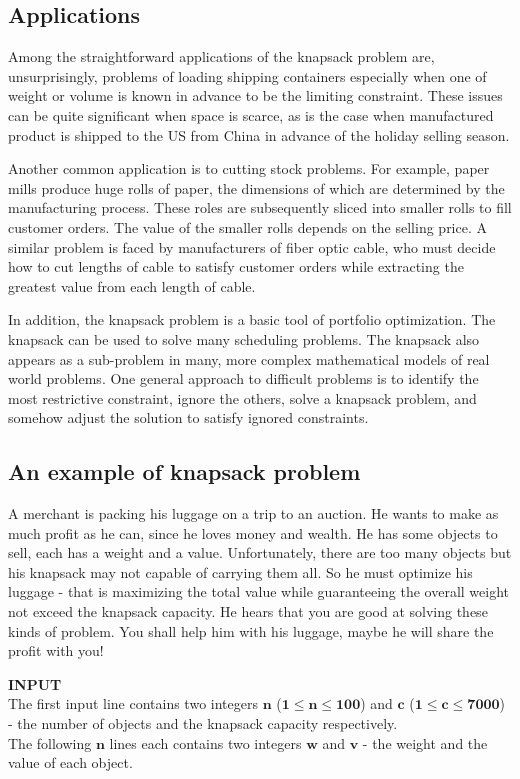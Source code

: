 \documentclass{article}
\begin{document}
\subsection{Applications}
\indent Among the straightforward applications of the knapsack problem are, unsurprisingly, problems of loading shipping containers especially when one of weight or volume is known in advance to be the limiting constraint. These issues can be quite significant when space is scarce, as is the case when manufactured product is shipped to the US from China in advance of the holiday selling season.

Another common application is to cutting stock problems. For example, paper mills produce huge rolls of paper, the dimensions of which are determined by the manufacturing process. These roles are subsequently sliced into smaller rolls to fill customer orders. The value of the smaller rolls depends on the selling price. A similar problem is faced by manufacturers of fiber optic cable, who must decide how to cut lengths of cable to satisfy customer orders while extracting the greatest value from each length of cable.

In addition, the knapsack problem is a basic tool of portfolio optimization. The knapsack can be used to solve many scheduling problems. The knapsack also appears as a sub-problem in many, more complex mathematical models of real world problems. One general approach to difficult problems is to identify the most restrictive constraint, ignore the others, solve a knapsack problem, and somehow adjust the solution to satisfy ignored constraints. 
\subsection{An example of knapsack problem}
A merchant is packing his luggage on a trip to an auction. He wants to make as much profit as he can, since he loves money and wealth. He has some objects to sell, each has a weight and a value. Unfortunately, there are too many objects but his knapsack may not capable of carrying them all. So he must optimize his luggage - that is maximizing the total value while guaranteeing the overall weight not exceed the knapsack capacity. He hears that you are good at solving these kinds of problem. You shall help him with his luggage, maybe he will share the profit with you!

\textbf{INPUT}\\
The first input line contains two integers $\textbf{n}$ ($\mathbf{1 \leq n \leq 100}$) and $\mathbf{c}$ ($\mathbf{1 \leq c \leq 7000}$) - the number of objects and the knapsack capacity respectively.\\
The following $\textbf{n}$ lines each contains two integers $\textbf{w}$ and $\textbf{v}$ - the weight and the value of each object.
\end{document}
